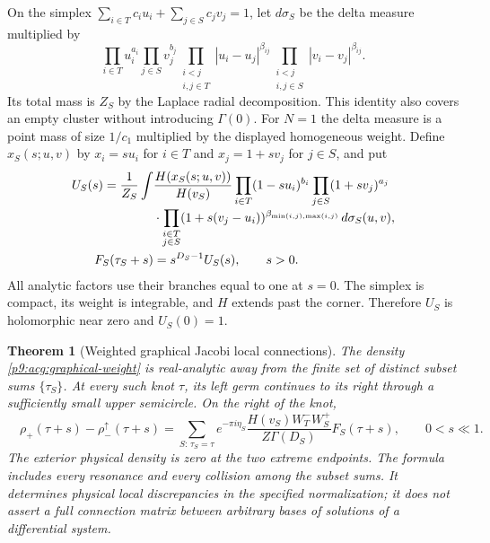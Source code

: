 \documentclass[11pt,a4paper]{article}
\newtheorem{theorem}{Theorem}[section]
\theoremstyle{definition}
\theoremstyle{remark}
\numberwithin{equation}{section}
\begin{document}
On the simplex $\sum_{i\in T}c_iu_i+\sum_{j\in S}c_jv_j=1$,
let $d\sigma_S$ be the delta measure multiplied by
\[
 \prod_{i\in T}u_i^{a_i}
 \prod_{j\in S}v_j^{b_j}
 \prod_{\substack{i<j\\i,j\in T}}|u_i-u_j|^{\beta_{ij}}
 \prod_{\substack{i<j\\i,j\in S}}|v_i-v_j|^{\beta_{ij}}.
\]
Its total mass is $Z_S$ by the Laplace radial decomposition. This
identity also covers an empty cluster without introducing
$\Gamma(0)$. For $N=1$ the delta measure is a point mass of size
$1/c_1$ multiplied by the displayed homogeneous weight.
Define $x_S(s;u,v)$ by $x_i=su_i$ for $i\in T$ and
$x_j=1+sv_j$ for $j\in S$, and put
\begin{align}
 U_S(s)=\frac1{Z_S}\int
 &\frac{H(x_S(s;u,v))}{H(v_S)}
 \prod_{i\in T}(1-su_i)^{b_i}
 \prod_{j\in S}(1+sv_j)^{a_j}\notag\\[-1mm]
 &\cdot\prod_{\substack{i\in T\\j\in S}}
          (1+s(v_j-u_i))^{\beta_{\min(i,j),\max(i,j)}}
          \,d\sigma_S(u,v),\label{p9:acg:graphical-U}\\
 F_S(\tau_S+s)&=s^{D_S-1}U_S(s),\qquad s>0.\label{p9:acg:graphical-F}
\end{align}
All analytic factors use their branches equal to one at $s=0$.
The simplex is compact, its weight is integrable, and $H$ extends
past the corner. Therefore $U_S$ is holomorphic near zero and
$U_S(0)=1$.

\begin{theorem}[Weighted graphical Jacobi local connections]
\label{p9:acg:graphical-theorem}
The density \eqref{p9:acg:graphical-weight} is real-analytic away from
the finite set of distinct subset sums $\{\tau_S\}$. At every such
knot $\tau$, its left germ continues to its right through a
sufficiently small upper semicircle. On the right of the knot,
\begin{equation}\label{p9:acg:graphical-jump}
 \boxed{\quad
 \rho_+(\tau+s)-\rho_-^\uparrow(\tau+s)
   =\sum_{S:\,\tau_S=\tau}
       e^{-\pi i\eta_S}\frac{H(v_S)W_T^-W_S^+}
                                  {Z\Gamma(D_S)}
       F_S(\tau+s),\qquad 0<s\ll1.\quad}
\end{equation}
The exterior physical density is zero at the two extreme endpoints.
The formula includes every resonance and every collision among the
subset sums. It determines physical local discrepancies in the
specified normalization; it does not assert a full connection matrix
between arbitrary bases of solutions of a differential system.
\end{theorem}
\end{document}

